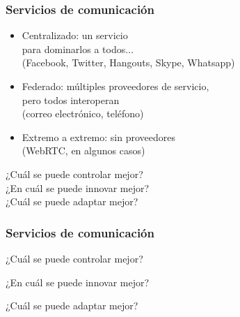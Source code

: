 \documentclass[17pt,aspectratio=169,hyperref=pdfusetitle]{beamer}
\begin{document}

\begin{frame}
\frametitle{Servicios de comunicación}

  \begin{itemize}
  \item Centralizado: un servicio \\
    para dominarlos a todos... \\
    (Facebook, Twitter, Hangouts, Skype, Whatsapp)
  \item Federado: múltiples proveedores de servicio, \\
    pero todos interoperan \\
    (correo electrónico, teléfono)
  \item Extremo a extremo: sin proveedores \\
    (WebRTC, en algunos casos)
  \end{itemize}

  \begin{flushright}
¿Cuál se puede controlar mejor? \\

¿En cuál se puede innovar mejor? \\

    ¿Cuál se puede adaptar mejor? \\
    \end{flushright}

\end{frame}


\begin{frame}
\frametitle{Servicios de comunicación}

\begin{flushright}
  {\Large
    ¿Cuál se puede controlar mejor? \\

    \vspace{.5cm}
    
    ¿En cuál se puede innovar mejor? \\

    \vspace{.5cm}

    ¿Cuál se puede adaptar mejor? \\
  }
    \end{flushright}

\end{frame}
\end{document}
